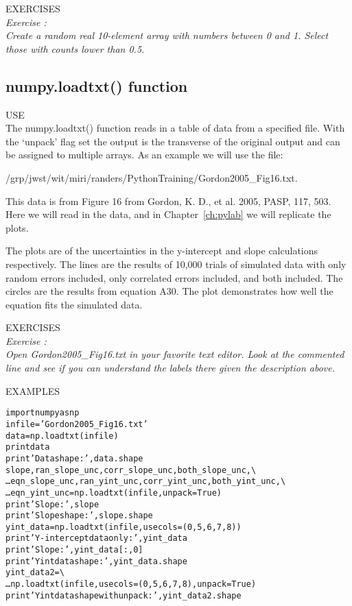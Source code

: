 {\color{blue} {\sf\small EXERCISES}} \\
{\it Exercise  :  \\
Create a random real 10-element array with numbers between 0 and 1.
Select those with counts lower than 0.5.}

\subsection{ {\sf numpy.loadtxt() } function}
\label{ss:loadtxt}

{\color{blue} {\sf\small USE}} \\
The {\sf\small numpy.loadtxt()} function reads in a table of data
from a specified file.  With the `unpack' flag set the output is the
transverse of the original output and can be assigned to multiple
arrays.  As an example we will use the file: 

/grp/jwst/wit/miri/randers/PythonTraining/Gordon2005\_Fig16.txt. 

This data is from Figure 16 from Gordon, K. D., et al. 2005, PASP,
117, 503.  Here we will read in the data, and in
Chapter~\ref{ch:pylab} we will replicate the plots.

The plots are of the uncertainties in the y-intercept and
slope calculations respectively.  The lines are the results of 10,000
trials of simulated data with only random errors included, only
correlated errors included, and both included.  The circles are the
results from  equation A30.  The plot demonstrates how well the
equation fits the simulated data. 

{\color{blue} {\sf\small EXERCISES}} \\
{\it Exercise  :  \\
  Open Gordon2005\_Fig16.txt in your favorite text editor.  Look at the
  commented line and see if you can understand the labels there given
  the description above.}

{\color{blue} {\sf\small EXAMPLES}} \\
\begin{alltt}
\pytab import numpy as np 
\pytab infile = 'Gordon2005_Fig16.txt' 
\pytab data = np.loadtxt(infile) 
\pytab print data 
\pytab print 'Data shape: ',data.shape  
\pytab slope, ran_slope_unc, corr_slope_unc, both_slope_unc,  \textbackslash
\ldots     eqn_slope_unc, ran_yint_unc, corr_yint_unc, both_yint_unc,  \textbackslash
\ldots     eqn_yint_unc = np.loadtxt(infile, unpack=True) 
\pytab print 'Slope: ', slope 
\pytab print 'Slope shape: ',slope.shape  
\pytab yint_data = np.loadtxt(infile,usecols=(0,5,6,7,8)) 
\pytab print 'Y-intercept data only: ',yint_data  
\pytab print 'Slope: ',yint_data[:,0]  
\pytab print 'Yint data shape: ',yint_data.shape 
\pytab yint_data2 =  \textbackslash
\ldots     np.loadtxt(infile,usecols=(0,5,6,7,8),unpack=True)  
\pytab print 'Yint data shape with unpack: ',yint_data2.shape
\end{alltt}

